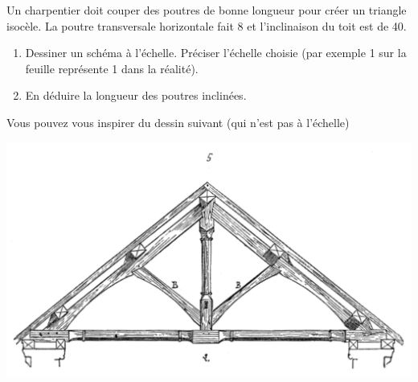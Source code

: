 
\begin{exercice}\label{exosmath-0824}

    Un charpentier doit couper des poutres de bonne longueur pour créer un triangle isocèle. La poutre transversale horizontale fait \unit{8}{\meter} et l'inclinaison du toit est de \unit{40}{\degree}. 
    \begin{enumerate}
        \item
            Dessiner un schéma à l'échelle. Préciser l'échelle choisie (par exemple \unit{1}{\centi\meter} sur la feuille représente \unit{1}{\meter} dans la réalité).
        \item
            En déduire la longueur des poutres inclinées.
    \end{enumerate}

    Vous pouvez vous inspirer du dessin suivant\cite{EKNooAsTWza} (qui n'est pas à l'échelle)
    \begin{center}
    \includegraphics[width=0.7\linewidth]{Charpenteetjambettes.pdf}
    \end{center}
    
\end{exercice}
